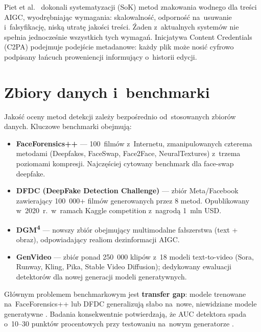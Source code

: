 Piet et al.\ \cite{Piet2024SoKWatermarking} dokonali systematyzacji
(SoK) metod znakowania wodnego dla tre\'{s}ci AIGC, wyodr\k{e}bniaj\k{a}c
wymagania: skalowalno\'{s}\'{c}, odporno\'{s}\'{c} na~usuwanie i~falsyfikacj\k{e},
nisk\k{a} utrat\k{e} jako\'{s}ci tre\'{s}ci. \'{Z}aden z~aktualnych system\'{o}w
nie spe\l{}nia jednocze\'{s}nie wszystkich tych wymaga\'{n}.
Inicjatywa Content Credentials (C2PA) \cite{C2PA2024Spec} podejmuje
podej\'{s}cie metadanowe: ka\.{z}dy plik mo\.{z}e nosi\'{c} cyfrowo podpisany
\l{}a\'{n}cuch proweniencji informuj\k{a}cy o~historii edycji.

\section{Zbiory danych i~benchmarki}
\label{sec:zbiory_danych_lit}

Jako\'{s}\'{c} oceny metod detekcji zale\.{z}y bezpo\'{s}rednio od~stosowanych
zbior\'{o}w danych. Kluczowe benchmarki obejmuj\k{a}:

\begin{itemize}
  \item \textbf{FaceForensics++} \cite{Rossler2019FaceForensics} ---
        100~film\'{o}w z~Internetu, zmanipulowanych czterema
        metodami (Deepfakes, FaceSwap, Face2Face, NeuralTextures)
        z~trzema poziomami kompresji. Najcz\k{e}\'{s}ciej cytowany benchmark
        dla face-swap deepfake.
  \item \textbf{DFDC (DeepFake Detection Challenge)} \cite{Dolhansky2020DFDC} ---
        zbi\'{o}r Meta/Facebook zawieraj\k{a}cy 100~000+ film\'{o}w
        generowanych przez 8 metod. Opublikowany w~2020~r.~w~ramach
        Kaggle competition z~nagrod\k{a} 1~mln USD.
  \item \textbf{DGM\textsuperscript{4}} \cite{Shao2023DGM4} ---
        nowszy zbi\'{o}r obejmuj\k{a}cy multimodalne fa\l{}szerstwa
        (text + obraz), odpowiadaj\k{a}cy realiom dezinformacji AIGC.
  \item \textbf{GenVideo} \cite{Sun2024GenVideo} ---
        zbi\'{o}r ponad 250~000 klip\'{o}w z~18 modeli text-to-video
        (Sora, Runway, Kling, Pika, Stable Video Diffusion);
        dedykowany ewaluacji detektor\'{o}w dla nowej generacji
        modeli generatywnych.
\end{itemize}

G\l{}\'{o}wnym problemem benchmarkowym jest \textbf{transfer gap}: modele
trenowane na~FaceForensics++ lub DFDC generalizuj\k{a} s\l{}abo na~nowe,
niewidziane modele generatywne \cite{Peng2024GenerationDetection}.
Badania konsekwentnie potwierdzaj\k{a},
\.{z}e AUC detektora spada o~10--30 punkt\'{o}w procentowych
przy testowaniu na~nowym generatorze \cite{Wang2024ReliabilityPerspective}.

